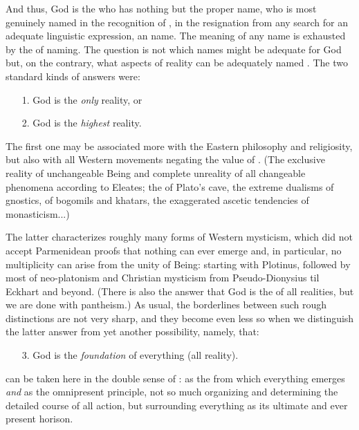 

And thus, God is the  who has nothing but the proper name, who is most
genuinely named in the recognition of , in the resignation
from any search for an adequate linguistic expression, an 
name. The meaning of any  name is exhausted by the  of
naming. The question is not which names might be adequate for God but, on the contrary, 
what aspects of reality can be adequately named
. 
The two standard kinds of answers were:
\begin{itemize}\MyLPar
  \item[1.] God is the {\em only} reality, or
  \item[2.] God is the {\em highest} reality.\vspace*{-1ex}
\end{itemize}    
The first one may be associated more with the Eastern philosophy and
religiosity, but also with all Western movements negating the value of . (The exclusive reality of unchangeable Being and complete unreality of
all changeable phenomena according to Eleates; the  of Plato's
cave, the extreme dualisms of gnostics, of 
bogomils and khatars, the exaggerated 
ascetic tendencies of monasticism...)

The latter characterizes roughly many forms of Western mysticism, which did not
accept Parmenidean proofs that nothing can ever emerge and, in particular, no
multiplicity can arise from the unity of Being: starting with Plotinus, followed
by most of neo-platonism and Christian mysticism from Pseudo-Dionysius til
Eckhart and beyond. (There is also the answer that God is the  of
all realities, but we are done with pantheism.)  As usual, the borderlines
between such rough distinctions are not very sharp, and they become even less so
when we distinguish the latter answer from yet another possibility, namely,
that:
\begin{itemize}\MyLPar
  \item[3.] God is the {\em foundation} of everything (all reality).\vspace*{-1ex}
\end{itemize}
 can be taken here in the double sense of : as the
 from which everything emerges {\em and} as the omnipresent
principle, not so much organizing and determining the detailed course of all
action, but surrounding everything as its ultimate and ever present horison.

